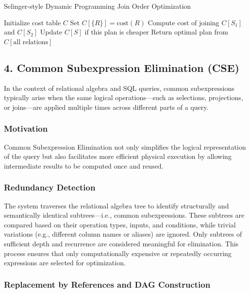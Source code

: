 \documentclass[12pt]{article}
\begin{document}
\begin{algorithm}[H]
\caption{Selinger-style Dynamic Programming Join Order Optimization}
\begin{algorithmic}
\State Initialize cost table $C$
    \State Set $C[\{R\}] = \text{cost}(R)$
\EndFor
{}
            \State Compute cost of joining $C[S_1]$ and $C[S_2]$
            \State Update $C[S]$ if this plan is cheaper
        \EndFor
    \EndFor
\EndFor
\State Return optimal plan from $C[\text{all relations}]$
\end{algorithmic}
\end{algorithm}

\subsection*{4. Common Subexpression Elimination (CSE)}

In the context of relational algebra and SQL queries, common subexpressions typically arise when the same logical operations—such as selections, projections, or joins—are applied multiple times across different parts of a query.

\subsubsection*{Motivation}
Common Subexpression Elimination not only simplifies the logical representation of the query but also facilitates more efficient physical execution by allowing intermediate results to be computed once and reused.

\subsubsection*{Redundancy Detection}

The system traverses the relational algebra tree to identify structurally and semantically identical subtrees—i.e., common subexpressions. These subtrees are compared based on their operation types, inputs, and conditions, while trivial variations (e.g., different column names or aliases) are ignored. Only subtrees of sufficient depth and recurrence are considered meaningful for elimination. This process ensures that only computationally expensive or repeatedly occurring expressions are selected for optimization.

\subsubsection*{Replacement by References and DAG Construction}
\end{document}
